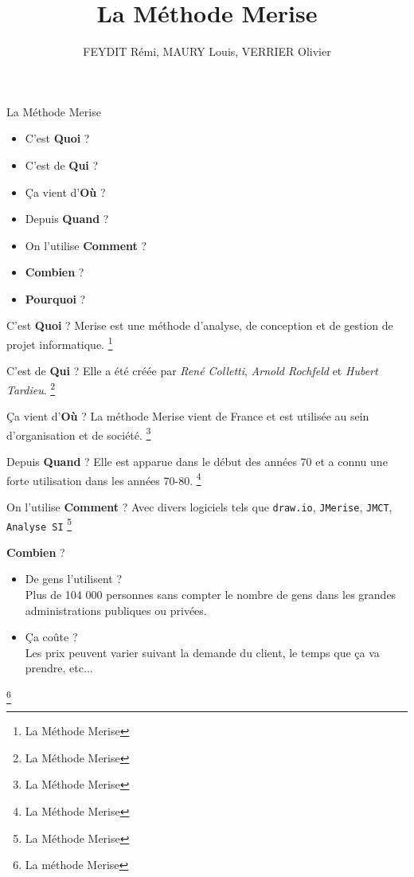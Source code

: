 \documentclass{beamer}
\begin{document}
\begin{frame} %
\title{La Méthode Merise}
\author{FEYDIT Rémi, MAURY Louis, VERRIER Olivier}
\titlepage
\end{frame}

\begin{frame}{La Méthode Merise} %
\begin{itemize}
\item C'est \textbf{Quoi} ?
\item C'est de \textbf{Qui} ?
\item Ça vient d'\textbf{Où} ?
\item Depuis \textbf{Quand} ?
\item On l'utilise \textbf{Comment} ?
\item \textbf{Combien} ?
\item \textbf{Pourquoi} ?
\end{itemize}
\end{frame}

\begin{frame}{C'est \textbf{Quoi} ?}
Merise est une méthode d’analyse, de conception et de gestion de projet informatique.
\footnote{La Méthode Merise}
\end{frame}

\begin{frame}{C'est de \textbf{Qui} ?}
Elle a été créée par \textsl{René Colletti}, \textsl{Arnold Rochfeld} et \textsl{Hubert Tardieu}.
\footnote{La Méthode Merise}
\end{frame}

\begin{frame}{Ça vient d'\textbf{Où} ?}
La méthode Merise vient de France et est utilisée au sein d’organisation et de société.
\footnote{La Méthode Merise}
\end{frame}

\begin{frame}{Depuis \textbf{Quand} ?}
Elle est apparue dans le début des années 70 et a connu une forte utilisation dans les années 70-80.
\footnote{La Méthode Merise}
\end{frame}

\begin{frame}{On l'utilise \textbf{Comment} ?}
Avec divers logiciels tels que \texttt{draw.io}, \texttt{JMerise}, \texttt{JMCT}, \texttt{Analyse SI}
\footnote{La Méthode Merise}
\end{frame}

\begin{frame}{\textbf{Combien} ?}
\begin{itemize}
\item De gens l'utilisent ?\\
Plus de 104 000 personnes sans compter le nombre de gens dans les grandes administrations publiques ou privées.
\item Ça coûte ?\\
Les prix peuvent varier suivant la demande du client, le temps que ça va prendre, etc...
\end{itemize}
\footnote{La méthode Merise}
\end{frame}
\end{document}
